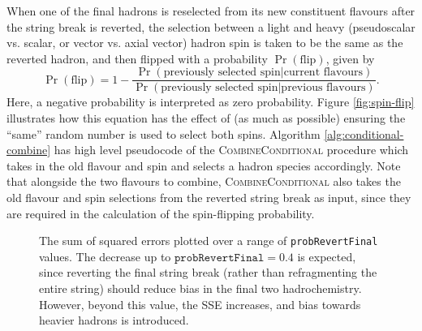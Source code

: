 \documentclass[12pt,a4paper]{report}
\begin{document}
When one of the final hadrons is reselected from its new constituent flavours after the string break is reverted, the selection between a light and heavy (pseudoscalar vs. scalar, or vector vs. axial vector) hadron spin is taken to be the same as the reverted hadron, and then flipped with a probability $\Pr(\text{flip})$, given by
\begin{equation}\label{eq:spin-flip}
  \Pr(\text{flip}) = 1 - \frac{\Pr(\text{previously selected spin} | \text{current flavours})}{\Pr(\text{previously selected spin} | \text{previous flavours})}.
\end{equation}
Here, a negative probability is interpreted as zero probability. Figure \ref{fig:spin-flip} illustrates how this equation has the effect of (as much as possible) ensuring the ``same'' random number is used to select both spins. Algorithm \ref{alg:conditional-combine} has high level pseudocode of the \textsc{CombineConditional} procedure which takes in the old flavour and spin and selects a hadron species accordingly. Note that alongside the two flavours to combine, \textsc{CombineConditional} also takes the old flavour and spin selections from the reverted string break as input, since they are required in the calculation of the spin-flipping probability.

\begin{figure}
  \centering
  \begin{minipage}[t]{0.48\linewidth}
    \centering
    
    \caption{The rapidity plateau for different values of \texttt{probRevertFinal}, with all other parameters set to PYTHIA 8.135 defaults. The dip in the plateau becomes slightly larger as the parameter increases, since reverting the final string break allows for more kinetic energy to be available to the final two hadrons.}
    \label{fig:dNdy-probrevertfinal}
  \end{minipage}
  \hfill
  \begin{minipage}[t]{0.48\linewidth}
    \centering
    
    \caption{The sum of squared errors plotted over a range of \texttt{probRevertFinal} values. The decrease up to $\texttt{probRevertFinal} = 0.4$ is expected, since reverting the final string break (rather than refragmenting the entire string) should reduce bias in the final two hadrochemistry. However, beyond this value, the SSE increases, and bias towards heavier hadrons is introduced.}
    \label{fig:sse-probrevertfinal}
  \end{minipage}
\end{figure}
\end{document}
